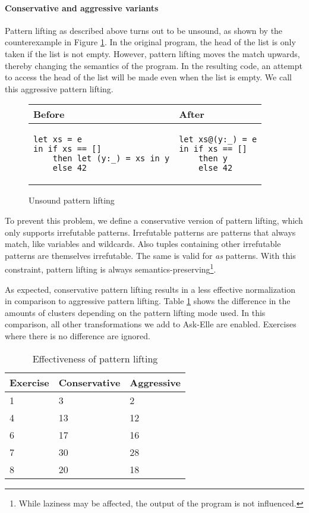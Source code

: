 \paragraph{Conservative and aggressive variants}

Pattern lifting as described above turns out to be unsound, as shown by the counterexample in Figure \ref{fig:pattern-lifting-unsound}. In the original program, the head of the list is only taken if the list is not empty. However, pattern lifting moves the match upwards, thereby changing the semantics of the program. In the resulting code, an attempt to access the head of the list will be made even when the list is empty. We call this aggressive pattern lifting.

\begin{figure}
\centering
\begin{tabular}{ >{\centering\arraybackslash}m{17em} | >{\centering\arraybackslash}m{10em} }
Before & After \\
\hline
\begin{verbatim}
let xs = e
in if xs == []
    then let (y:_) = xs in y
    else 42
\end{verbatim}
& \begin{verbatim}
let xs@(y:_) = e
in if xs == []
    then y
    else 42
\end{verbatim}
\end{tabular}
\caption{Unsound pattern lifting}
\label{fig:pattern-lifting-unsound}
\end{figure}

To prevent this problem, we define a conservative version of pattern lifting, which only supports irrefutable patterns. Irrefutable patterns are patterns that always match, like variables and wildcards. Also tuples containing other irrefutable patterns are themselves irrefutable. The same is valid for \emph{as} patterns. With this constraint, pattern lifting is always semantics-preserving\footnote{While laziness may be affected, the output of the program is not influenced.}.

As expected, conservative pattern lifting results in a less effective normalization in comparison to aggressive pattern lifting. Table \ref{tb:patterns-lifting-effectiveness} shows the difference in the amounts of clusters depending on the pattern lifting mode used. In this comparison, all other transformations we add to Ask-Elle are enabled. Exercises where there is no difference are ignored.

\begin{table}
\centering
\begin{tabular}{ m{6em} | m{6em} | m{6em} }
Exercise & Conservative & Aggressive \\
\hline
1 & 3 & 2 \\
\hline
4 & 13 & 12 \\
\hline
6 & 17 & 16 \\
\hline
7 & 30 & 28 \\
\hline
8 & 20 & 18
\end{tabular}
\caption{Effectiveness of pattern lifting}
\label{tb:patterns-lifting-effectiveness}
\end{table}

